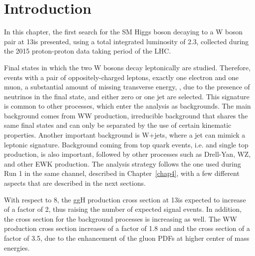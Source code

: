 \section{Introduction}\label{sec:chap5_introduction}

In this chapter, the first search for the SM Higgs boson decaying to a W boson pair at 13\TeV is presented, using a total integrated luminosity of 2.3\ifb,
collected during the 2015 proton-proton data taking period of the LHC.

Final states in which the two W bosons decay leptonically are studied.
Therefore, events with a pair of oppositely-charged leptons,
exactly one electron and one muon, a substantial amount of missing transverse energy, \MET, 
due to the presence of neutrinos in the final state, and either zero or one jet are selected. 
This signature is common to other processes, which enter the analysis as backgrounds.
The main background comes from WW production, irreducible background that shares the same final states and can only 
be separated by the use of certain kinematic properties.
Another important background is W+jets, where a jet can mimick a leptonic signature.
Background coming from top quark events, i.e. \ttbar and single top production, is also important, 
followed by other processes such as Drell-Yan, WZ, and other EWK production.
The analysis strategy follows the one used during Run 1 in the same channel, described in Chapter~\ref{chap4}, with a few different aspects that are described in the next sections.

With respect to 8\TeV, the ggH production cross section at 13\TeV is expected to increase of a factor of 2, thus raising the number of expected signal events. In addition, the cross section for the background processes is increasing as well. The WW production cross section increases of a factor of 1.8 and and the \ttbar cross section of a factor of 3.5, due to the enhancement of the gluon PDFs at higher center of mass energies. 
